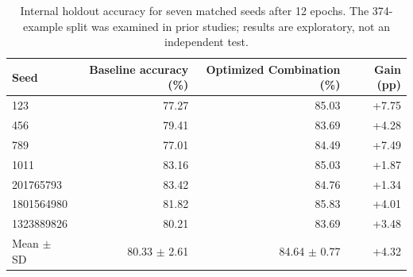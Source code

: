 \begin{table}[tp]
\centering\small\setlength{\tabcolsep}{4pt}
\caption{Internal holdout accuracy for seven matched seeds after 12 epochs. The 374-example split was examined in prior studies; results are exploratory, not an independent test.}
\label{tab:heldout-accuracy}
\begin{tabular}{lrrr}
\toprule
Seed & Baseline accuracy (\%) & Optimized Combination (\%) & Gain (pp) \\
\midrule
123 & 77.27 & 85.03 & +7.75 \\
456 & 79.41 & 83.69 & +4.28 \\
789 & 77.01 & 84.49 & +7.49 \\
1011 & 83.16 & 85.03 & +1.87 \\
201765793 & 83.42 & 84.76 & +1.34 \\
1801564980 & 81.82 & 85.83 & +4.01 \\
1323889826 & 80.21 & 83.69 & +3.48 \\
\midrule
Mean $\pm$ SD & 80.33 $\pm$ 2.61 & 84.64 $\pm$ 0.77 & +4.32 \\
\bottomrule
\end{tabular}
\end{table}
